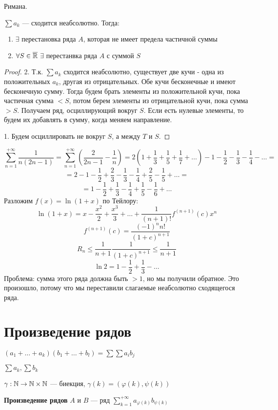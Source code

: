 \begin{theorem}
    Римана.

    $\sum a_k$ --- сходится неабсолютно. Тогда:
    \begin{enumerate}
        \item $\exists$ перестановка ряда $A$, которая не имеет предела частичной суммы
        \item $\forall S\in\overline{\mathbb{R}}$ $\exists$ перестанвка ряда $A$ с суммой $S$
    \end{enumerate}
\end{theorem}
\begin{proof}
    2. Т.к. $\sum a_k$ сходится неабсолютно, существует две кучи - одна из положительных $a_k$, другая из отрицательных. Обе кучи бесконечные и имеют бесконечную сумму. Тогда будем брать элементы из положительной кучи, пока частичная сумма $<S$, потом берем элементы из отрицательной кучи, пока сумма $>S$. Получаем ряд, осциллирующий вокруг $S$. Если есть нулевые элементы, то будем их добавлять в сумму, когда меняем направление.

    1. Будем осциллировать не вокруг $S$, а между $T$ и $S$.
\end{proof}

\begin{example}
    $$\sum_{n=1}^{+\infty}\frac{1}{n(2n-1)}=\sum_{n=1}^{+\infty}\left(\frac{2}{2n-1}-\frac{1}{n}\right)=2\left(1+\frac{1}{3}+\frac{1}{5}+\frac{1}{7}+\ldots\right)-1-\frac{1}{2}-\frac{1}{3}-\frac{1}{4}-\ldots=$$
    $$=2-1-\frac{1}{2}+\frac{2}{3}-\frac{1}{3}-\frac{1}{4}+\frac{2}{5}-\frac{1}{5}+\ldots=$$
    $$=1-\frac{1}{2}+\frac{1}{3}-\frac{1}{4}+\frac{1}{5}-\frac{1}{6}+\ldots$$
    Разложим $f(x)=\ln(1+x)$ по Тейлору:
    $$\ln(1+x)=x-\frac{x^2}{2}+\frac{x^3}{3}+\ldots+\frac{1}{(n+1)!}f^{(n+1)}(c)x^n$$
    $$f^{(n+1)}(c)=\frac{(-1)^n n!}{(1+c)^{n+1}}$$
    $$R_n\le \frac{1}{n+1}\frac{1}{(1+c)^{n+1}}\le \frac{1}{n+1}$$
    $$\ln 2 = 1-\frac{1}{2}+\frac{1}{3}-\ldots$$
    Проблема: сумма этого ряда должна быть $>1$, но мы получили обратное. Это произошло, потому что мы переставили слагаемые неабсолютно сходящегося ряда.
\end{example}

\section*{Произведение рядов}

$(a_1+\ldots+a_k)(b_1+\ldots+b_l)=\sum\sum a_ib_j$

\begin{definition}
    $\sum a_k, \sum b_k$

    $\gamma : \mathbb{N}\to\mathbb{N}\times\mathbb{N}$ --- биекция, $\gamma(k)=(\varphi(k),\psi(k))$

    \textbf{Произведение рядов} $A$ и $B$ --- ряд $\sum_{k=1}^{+\infty} a_{\varphi(k)}b_{\psi(k)}$
\end{definition}

